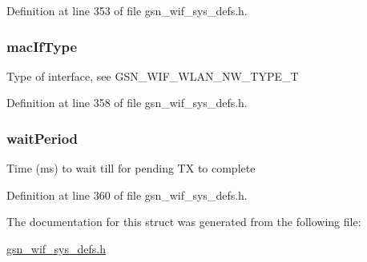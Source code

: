 Definition at line 353 of file gsn\_\-wif\_\-sys\_\-defs.h.

\hypertarget{a00355_ae22f1eeffa8ecf759f18f577db286c8d}{
\subsubsection[{macIfType}]{ {\bf macIfType}}}
\label{a00355_ae22f1eeffa8ecf759f18f577db286c8d}
Type of interface, see GSN\_\-WIF\_\-WLAN\_\-NW\_\-TYPE\_\-T 

Definition at line 358 of file gsn\_\-wif\_\-sys\_\-defs.h.

\hypertarget{a00355_a8bca99e0f7f7ec2ddca909f71f121850}{
\subsubsection[{waitPeriod}]{ {\bf waitPeriod}}}
\label{a00355_a8bca99e0f7f7ec2ddca909f71f121850}
Time (ms) to wait till for pending TX to complete 

Definition at line 360 of file gsn\_\-wif\_\-sys\_\-defs.h.



The documentation for this struct was generated from the following file:\begin{DoxyCompactItemize}
\item 
\hyperlink{a00612}{gsn\_\-wif\_\-sys\_\-defs.h}\end{DoxyCompactItemize}
